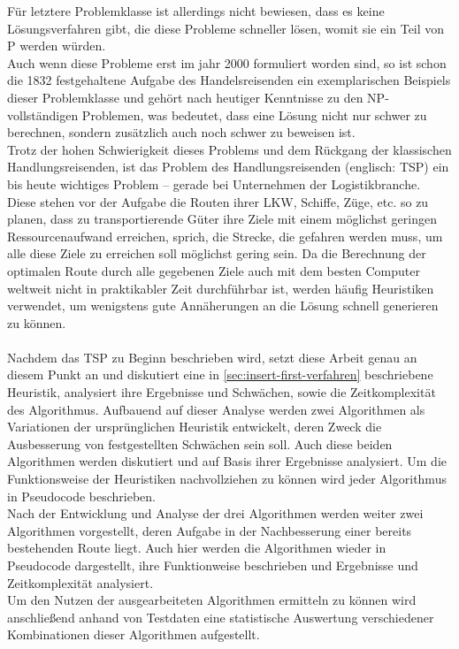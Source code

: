 Für letztere Problemklasse ist allerdings nicht bewiesen, dass es keine Lösungsverfahren gibt, die diese Probleme schneller lösen, womit sie ein Teil von P werden würden.
\\
Auch wenn diese Probleme erst im jahr 2000 formuliert worden sind, so ist schon die 1832 festgehaltene Aufgabe des Handelsreisenden ein exemplarischen Beispiels dieser Problemklasse und gehört nach heutiger Kenntnisse zu den NP-vollständigen Problemen, was bedeutet, dass eine Lösung nicht nur schwer zu berechnen, sondern zusätzlich auch noch schwer zu beweisen ist.
\\
Trotz der hohen Schwierigkeit dieses Problems und dem Rückgang der klassischen Handlungsreisenden, ist das Problem des Handlungsreisenden (englisch: \acf{TSP}) ein bis heute wichtiges Problem -- gerade bei Unternehmen der Logistikbranche.
Diese stehen vor der Aufgabe die Routen ihrer LKW, Schiffe, Züge, etc. so zu planen, dass zu transportierende Güter ihre Ziele mit einem möglichst geringen Ressourcenaufwand erreichen, sprich, die Strecke, die gefahren werden muss, um alle diese Ziele zu erreichen soll möglichst gering sein.
Da die Berechnung der optimalen Route durch alle gegebenen Ziele auch mit dem besten Computer weltweit nicht in praktikabler Zeit durchführbar ist, werden häufig Heuristiken verwendet, um wenigstens gute Annäherungen an die Lösung schnell generieren zu können.
\\\\
Nachdem das \ac{TSP} zu Beginn beschrieben wird, setzt diese Arbeit genau an diesem Punkt an und diskutiert eine in \vref{sec:insert-first-verfahren} beschriebene Heuristik, analysiert ihre Ergebnisse und Schwächen, sowie die Zeitkomplexität des Algorithmus. 
Aufbauend auf dieser Analyse werden zwei Algorithmen als Variationen der ursprünglichen Heuristik entwickelt, deren Zweck die Ausbesserung von festgestellten Schwächen sein soll.
Auch diese beiden Algorithmen werden diskutiert und auf Basis ihrer Ergebnisse analysiert.
Um die Funktionsweise der Heuristiken nachvollziehen zu können wird jeder Algorithmus in Pseudocode beschrieben.
\\
Nach der Entwicklung und Analyse der drei Algorithmen werden weiter zwei Algorithmen vorgestellt, deren Aufgabe in der Nachbesserung einer bereits bestehenden Route liegt.
Auch hier werden die Algorithmen wieder in Pseudocode dargestellt, ihre Funktionweise beschrieben und Ergebnisse und Zeitkomplexität analysiert.
\\
Um den Nutzen der ausgearbeiteten Algorithmen ermitteln zu können wird anschließend anhand von Testdaten eine statistische Auswertung verschiedener Kombinationen dieser Algorithmen aufgestellt.
